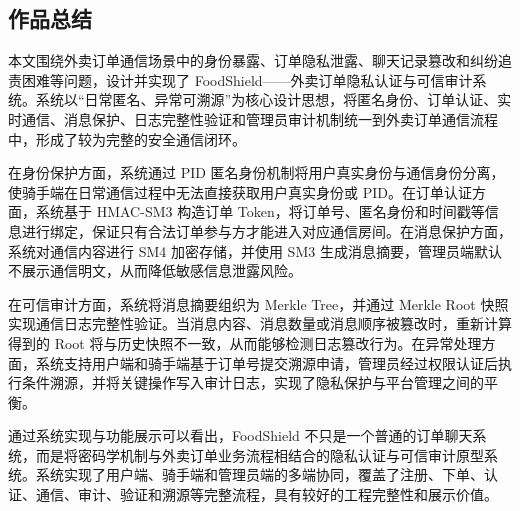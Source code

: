 \subsection{作品总结}

本文围绕外卖订单通信场景中的身份暴露、订单隐私泄露、聊天记录篡改和纠纷追责困难等问题，设计并实现了 FoodShield——外卖订单隐私认证与可信审计系统。系统以“日常匿名、异常可溯源”为核心设计思想，将匿名身份、订单认证、实时通信、消息保护、日志完整性验证和管理员审计机制统一到外卖订单通信流程中，形成了较为完整的安全通信闭环。

在身份保护方面，系统通过 PID 匿名身份机制将用户真实身份与通信身份分离，使骑手端在日常通信过程中无法直接获取用户真实身份或 PID。在订单认证方面，系统基于 HMAC-SM3 构造订单 Token，将订单号、匿名身份和时间戳等信息进行绑定，保证只有合法订单参与方才能进入对应通信房间。在消息保护方面，系统对通信内容进行 SM4 加密存储，并使用 SM3 生成消息摘要，管理员端默认不展示通信明文，从而降低敏感信息泄露风险。

在可信审计方面，系统将消息摘要组织为 Merkle Tree，并通过 Merkle Root 快照实现通信日志完整性验证。当消息内容、消息数量或消息顺序被篡改时，重新计算得到的 Root 将与历史快照不一致，从而能够检测日志篡改行为。在异常处理方面，系统支持用户端和骑手端基于订单号提交溯源申请，管理员经过权限认证后执行条件溯源，并将关键操作写入审计日志，实现了隐私保护与平台管理之间的平衡。

通过系统实现与功能展示可以看出，FoodShield 不只是一个普通的订单聊天系统，而是将密码学机制与外卖订单业务流程相结合的隐私认证与可信审计原型系统。系统实现了用户端、骑手端和管理员端的多端协同，覆盖了注册、下单、认证、通信、审计、验证和溯源等完整流程，具有较好的工程完整性和展示价值。